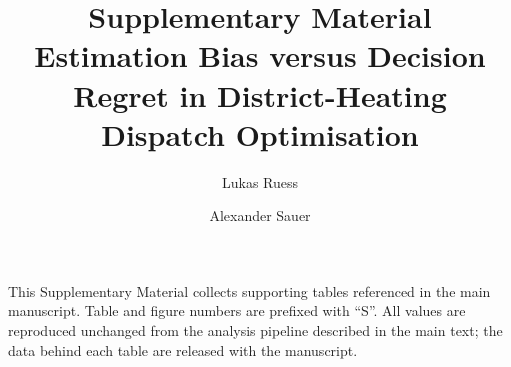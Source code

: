 \documentclass[11pt,a4paper]{article}
\title{Supplementary Material\\[2pt]
  \large Estimation Bias versus Decision Regret in District-Heating Dispatch Optimisation}
\author{Lukas Ruess \and Alexander Sauer}
\date{}
\begin{document}
\maketitle

This Supplementary Material collects supporting tables referenced in the main manuscript.
Table and figure numbers are prefixed with ``S''. All values are reproduced unchanged from
the analysis pipeline described in the main text; the data behind each table are released
with the manuscript.







\end{document}
